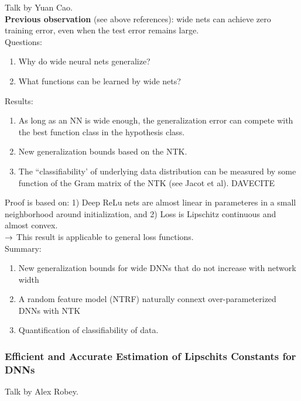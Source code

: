 Talk by Yuan Cao.\\

{\bf Previous observation} (see above references): wide nets can achieve zero training error, even when the test error remains large. \\

Questions:
\begin{enumerate}
    \item Why do wide neural nets generalize?
    \item What functions can be learned by wide nets?
\end{enumerate}

Results:
\begin{enumerate}
    \item As long as an NN is wide enough, the generalization error can compete with the best function class in the hypothesis class.
    \item New generalization bounds based on the NTK.
    \item The ``classifiability' of underlying data distribution can be measured by some function of the Gram matrix of the NTK (see Jacot et al).
    DAVECITE
\end{enumerate}

Proof is based on: 1) Deep ReLu nets are almost linear in parameteres in a small neighborhood around initialization, and 2) Loss is Lipschitz continuous and almost convex. \\

$\rightarrow$ This result is applicable to general loss functions. \\

Summary:
\begin{enumerate}
    \item New generalization bounds for wide DNNs that do not increase with network width
    \item A random feature model (NTRF) naturally connext over-parameterized DNNs with NTK
    \item Quantification of classifiability of data.
\end{enumerate}

\spacerule
\subsubsection{Efficient and Accurate Estimation of Lipschits Constants for DNNs \cite{fazlyab2019efficient}}

Talk by Alex Robey. \\

